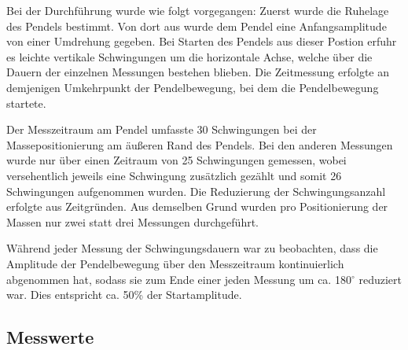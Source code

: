 Bei der Durchführung wurde wie folgt vorgegangen: Zuerst wurde die Ruhelage des Pendels bestimmt. Von dort aus wurde dem Pendel eine Anfangsamplitude von einer Umdrehung gegeben.
Bei Starten des Pendels aus dieser Postion erfuhr es leichte vertikale Schwingungen um die horizontale Achse, welche über die Dauern der einzelnen Messungen bestehen blieben.
Die Zeitmessung erfolgte an demjenigen Umkehrpunkt der Pendelbewegung, bei dem die Pendelbewegung startete.

Der Messzeitraum am Pendel umfasste 30 Schwingungen bei der Massepositionierung am äußeren Rand des Pendels.
Bei den anderen Messungen wurde nur über einen Zeitraum von 25 Schwingungen gemessen, wobei versehentlich jeweils eine Schwingung zusätzlich gezählt und somit 26 Schwingungen aufgenommen wurden. Die Reduzierung der Schwingungsanzahl erfolgte aus Zeitgründen.
Aus demselben Grund wurden pro Positionierung der Massen nur zwei statt drei Messungen durchgeführt.

Während jeder Messung der Schwingungsdauern war zu beobachten, dass die Amplitude der Pendelbewegung über den Messzeitraum kontinuierlich abgenommen hat, sodass sie zum Ende einer jeden Messung um ca. 180$^\circ$ reduziert war.
Dies entspricht ca. 50\% der Startamplitude.

\subsection{Messwerte}

